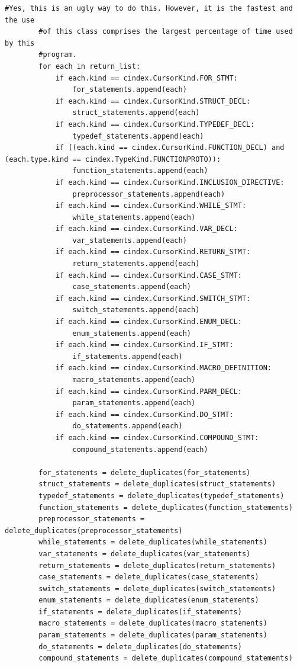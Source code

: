 \documentclass[11pt]{scrreprt}
\begin{document}
\begin{lstlisting}[frame=single,basicstyle=\small]
        #Yes, this is an ugly way to do this. However, it is the fastest and the use
        #of this class comprises the largest percentage of time used by this
        #program.
        for each in return_list:
            if each.kind == cindex.CursorKind.FOR_STMT:
                for_statements.append(each)
            if each.kind == cindex.CursorKind.STRUCT_DECL:
                struct_statements.append(each)
            if each.kind == cindex.CursorKind.TYPEDEF_DECL:
                typedef_statements.append(each)
            if ((each.kind == cindex.CursorKind.FUNCTION_DECL) and (each.type.kind == cindex.TypeKind.FUNCTIONPROTO)):
                function_statements.append(each)
            if each.kind == cindex.CursorKind.INCLUSION_DIRECTIVE:
                preprocessor_statements.append(each)
            if each.kind == cindex.CursorKind.WHILE_STMT:
                while_statements.append(each)
            if each.kind == cindex.CursorKind.VAR_DECL:
                var_statements.append(each)
            if each.kind == cindex.CursorKind.RETURN_STMT:
                return_statements.append(each)
            if each.kind == cindex.CursorKind.CASE_STMT:
                case_statements.append(each)
            if each.kind == cindex.CursorKind.SWITCH_STMT:
                switch_statements.append(each)
            if each.kind == cindex.CursorKind.ENUM_DECL:
                enum_statements.append(each)
            if each.kind == cindex.CursorKind.IF_STMT:
                if_statements.append(each)
            if each.kind == cindex.CursorKind.MACRO_DEFINITION:
                macro_statements.append(each)
            if each.kind == cindex.CursorKind.PARM_DECL:
                param_statements.append(each)
            if each.kind == cindex.CursorKind.DO_STMT:
                do_statements.append(each)
            if each.kind == cindex.CursorKind.COMPOUND_STMT:
                compound_statements.append(each)

        for_statements = delete_duplicates(for_statements)
        struct_statements = delete_duplicates(struct_statements)
        typedef_statements = delete_duplicates(typedef_statements)
        function_statements = delete_duplicates(function_statements)
        preprocessor_statements = delete_duplicates(preprocessor_statements)
        while_statements = delete_duplicates(while_statements)
        var_statements = delete_duplicates(var_statements)
        return_statements = delete_duplicates(return_statements)
        case_statements = delete_duplicates(case_statements)
        switch_statements = delete_duplicates(switch_statements)
        enum_statements = delete_duplicates(enum_statements)
        if_statements = delete_duplicates(if_statements)
        macro_statements = delete_duplicates(macro_statements)
        param_statements = delete_duplicates(param_statements)
        do_statements = delete_duplicates(do_statements)
        compound_statements = delete_duplicates(compound_statements)


\end{lstlisting}
\end{document}
